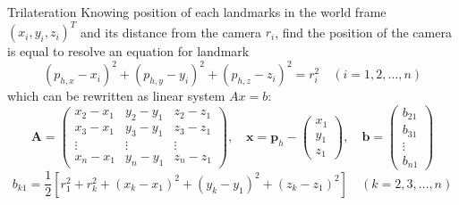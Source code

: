 \documentclass[10pt]{beamer}
\begin{document}
    \begin{frame}[fragile]{Trilateration}
        Knowing position of each landmarks in the world frame $(x_{i}, y_{i}, z_{i})^{T}$ and its distance from the camera $r_{i}$, find the position of the camera is equal to resolve an equation for landmark
        \begin{equation*}
            (p_{h,x} - x_i)^2 + (p_{h,y} - y_i)^2 + (p_{h,z} - z_i)^2 = r_i^2 \quad (i = 1, 2, \dots, n)
        \end{equation*}
        which can be rewritten as linear system $Ax= b$:
        \begin{equation*}
        \bm{A} = \begin{pmatrix}
                x_2 - x_1 & y_2 - y_1 & z_2 - z_1 \\
                x_3 - x_1 & y_3 - y_1 & z_3 - z_1 \\
                \vdots & \vdots & \vdots \\
                x_n - x_1 & y_n - y_1 & z_n - z_1
            \end{pmatrix}, \quad
        \bm{x} =
            \bm{p}_h -
            \begin{pmatrix}
                x_1 \\
                y_1 \\
                z_1
            \end{pmatrix}, \quad
        \bm{b} = \begin{pmatrix}
                b_{21} \\
                b_{31} \\
                \vdots \\
                b_{n1}
            \end{pmatrix}
    \end{equation*}
    \begin{equation*}
        b_{k1} = \frac{1}{2}\left[ r_1^2 + r_k^2 + (x_k - x_1)^2 + (y_k - y_1)^2 + (z_k - z_1)^2 \right] \quad (k = 2, 3, \dots, n)
    \end{equation*}

    \end{frame}
\end{document}
